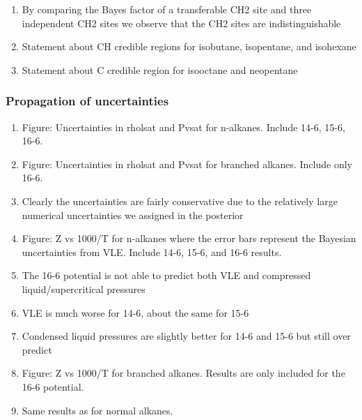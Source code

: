 \documentclass[journal=jctc,manuscript=article]{achemso}
\begin{document}
\begin{enumerate}
	\item By comparing the Bayes factor of a transferable CH2 site and three independent CH2 sites we observe that the CH2 sites are indistinguishable
	\item Statement about CH credible regions for isobutane, isopentane, and isohexane
	\item Statement about C credible region for isooctane and neopentane
\end{enumerate}

\subsubsection{Propagation of uncertainties}

\begin{enumerate}
	\item Figure: Uncertainties in rholsat and Pvsat for n-alkanes. Include 14-6, 15-6, 16-6.
	\item Figure: Uncertainties in rholsat and Pvsat for branched alkanes. Include only 16-6.
	\item Clearly the uncertainties are fairly conservative due to the relatively large numerical uncertainties we assigned in the posterior
	\item Figure: Z vs 1000/T for n-alkanes where the error bars represent the Bayesian uncertainties from VLE. Include 14-6, 15-6, and 16-6 results.
	\item The 16-6 potential is not able to predict both VLE and compressed liquid/supercritical pressures
	\item VLE is much worse for 14-6, about the same for 15-6
	\item Condensed liquid pressures are slightly better for 14-6 and 15-6 but still over predict
	\item Figure: Z vs 1000/T for branched alkanes. Results are only included for the 16-6 potential.
	\item Same results as for normal alkanes.
\end{enumerate}
\end{document}
